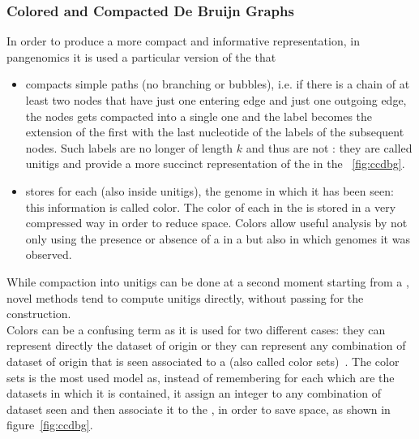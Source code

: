 \subsubsection{Colored and Compacted De Bruijn Graphs}
In order to produce a more compact and informative representation, in pangenomics it is used a particular version of the \dbg that 
\begin{itemize}
	\item compacts simple paths (no branching or bubbles), i.e. if there is a chain of at least two nodes that have just one entering edge and just one outgoing edge, the nodes gets compacted into a single one and the label becomes the extension of the first \kmer with the last nucleotide of the labels of the subsequent nodes. Such labels are no longer of length $k$ and thus are not \kmers: they are called unitigs and provide a more succinct representation of the \kmers in the \dbg~\ref{fig:ccdbg}.
	\item stores for each \kmer (also inside unitigs), the genome in which it has been seen: this information is called color. The color of each \kmer in the \ccdbg is stored in a very compressed way in order to reduce space. Colors allow useful analysis by not only using the presence or absence of a \kmer in a \dbg but also in which genomes it was observed.
\end{itemize}
While \kmer compaction into unitigs can be done at a second moment starting from a \dbg, novel methods tend to compute unitigs directly, without passing for the \dbg construction.\\
Colors can be a confusing term as it is used for two different cases: they can represent directly the dataset of origin or they can represent any combination of dataset of origin that is seen associated to a \kmer (also called color sets)~\cite{marchet_kmersets}. The color sets is the most used model as, instead of remembering for each \kmer which are the datasets in which it is contained, it assign an integer to any combination of dataset seen and then associate it to the \kmers, in order to save space, as shown in figure~\ref{fig:ccdbg}. 
